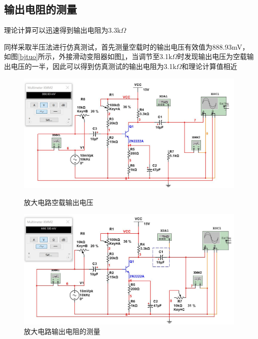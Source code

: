 \documentclass[UTF8,a4paper]{ctexart}
\begin{document}
\subsection{输出电阻的测量}
理论计算可以迅速得到输出电阻为$3.3\mathrm{k}\Omega$

同样采取半压法进行仿真测试，首先测量空载时的输出电压有效值为888.93mV，如图\ref{bjtuo}所示，外接滑动变阻器如图\ref{bjtro}，当调节至3.1$\mathrm{k}\Omega$时发现输出电压为空载输出电压的一半，因此可以得到仿真测试的输出电阻为3.1$\mathrm{k}\Omega$和理论计算值相近
\begin{figure}
\centering
\includegraphics[width=\textwidth]{1-2Uo.jpg}
\caption{放大电路空载输出电压}
\label{bjtuo}
\includegraphics[width=\textwidth]{1-2Ro.jpg}
\caption{放大电路输出电阻的测量}
\label{bjtro}
\end{figure}
\end{document}
